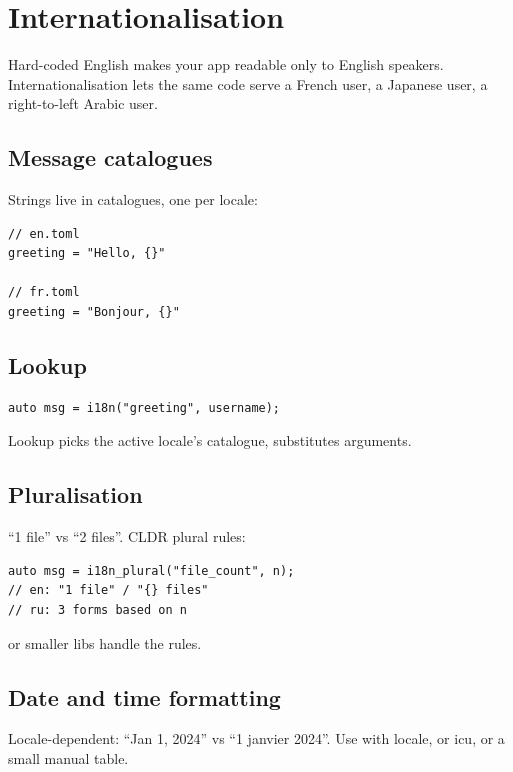 \chapter{Internationalisation}
\label{ch:i18n2}

\begin{aside}
Hard-coded English makes your app readable only to English
speakers. Internationalisation lets the same code serve a
French user, a Japanese user, a right-to-left Arabic user.
\end{aside}

\section{Message catalogues}

Strings live in catalogues, one per locale:

\begin{lstlisting}
// en.toml
greeting = "Hello, {}"

// fr.toml
greeting = "Bonjour, {}"
\end{lstlisting}

\section{Lookup}

\begin{lstlisting}
auto msg = i18n("greeting", username);
\end{lstlisting}

Lookup picks the active locale's catalogue, substitutes
arguments.

\section{Pluralisation}

``1 file'' vs ``2 files''. CLDR plural rules:

\begin{lstlisting}
auto msg = i18n_plural("file_count", n);
// en: "1 file" / "{} files"
// ru: 3 forms based on n
\end{lstlisting}

 or smaller libs handle the rules.

\section{Date and time formatting}

Locale-dependent: ``Jan 1, 2024'' vs ``1 janvier 2024''.
Use  with locale, or icu, or a small
manual table.

